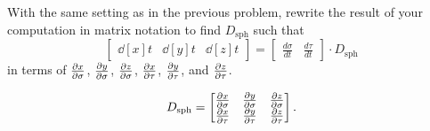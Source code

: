 \documentclass{ximera}
\begin{document}
\begin{problem}
  With the same setting as in the previous problem, rewrite the result
  of your computation in matrix notation to find $D_{\mathrm{sph}}$ such
  that
\[
\begin{bmatrix}
\dd[x]{t} & \dd[y]{t} & \dd[z]{t}
\end{bmatrix}
=
\begin{bmatrix}
\frac{d\sigma}{dt} & \frac{d\tau}{dt}
\end{bmatrix}\cdot D_{\mathrm{sph}}
\]
in terms of $\pp[x]{\sigma}$, $\pp[y]{\sigma}$, $\pp[z]{\sigma}$,
$\pp[x]{\tau}$, $\pp[y]{\tau}$, and $\pp[z]{\tau}$.
\begin{freeResponse}
  \[
  D_{\mathrm{sph}} =
  \begin{bmatrix}
    \pp[x]{\sigma} & \pp[y]{\sigma} & \pp[z]{\sigma} \\
    \pp[x]{\tau}   & \pp[y]{\tau}   & \pp[z]{\tau}
  \end{bmatrix}.
  \]
\end{freeResponse}
\end{problem}
\end{document}
